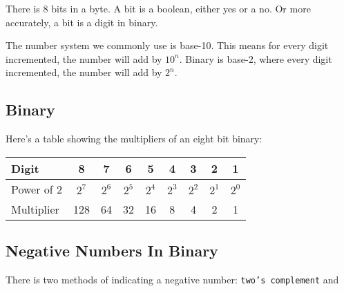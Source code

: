 \documentclass[../notes.tex]{subfiles}
\begin{document}
There is 8 bits in a byte.
A bit is a boolean, either yes or a no.
Or more accurately, a bit is a digit in binary.

The number system we commonly use is base-10.
This means for every digit incremented, the number will add by $10^n$.
Binary is base-2, where every digit incremented, the number will add by $2^n$.

\subsection{Binary}
Here's a table showing the multipliers of an eight bit binary:
\begin{tabular}{|l|c|c|c|c|c|c|c|c|}
	\hline
	Digit      & 8     & 7     & 6     & 5     & 4     & 3     & 2     & 1 \\
	\hline
	Power of 2 & $2^7$ & $2^6$ & $2^5$ & $2^4$ & $2^3$ & $2^2$ & $2^1$ & $2^0$ \\
	\hline
	Multiplier & 128   & 64    & 32    & 16    & 8     & 4     & 2     & 1
	\hline
\end{tabular}

\subsection{Negative Numbers In Binary}

There is two methods of indicating a negative number: \texttt{two's complement} and \texttt{}
\end{document}
